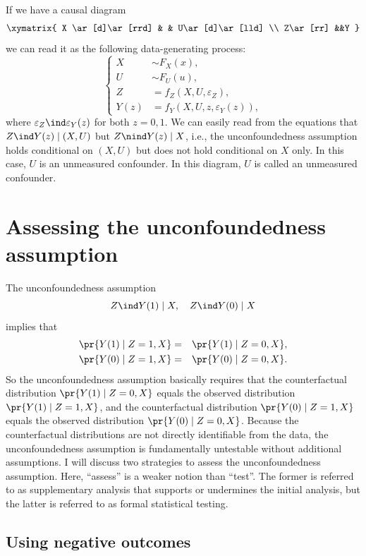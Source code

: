 If we have a causal diagram 
$$
\xymatrix{
 X \ar[d]\ar[rrd] & & U\ar[d]\ar[lld] \\
Z\ar[rr] &&Y 
}
$$
we can read it as  the following data-generating process: 
$$
\left\{ 
\begin{aligned}
       X & \sim F_X(x), \\
       U& \sim F_U(u), \\ 
      Z  &=   f_Z(X, U,  \varepsilon_Z) , \\
      Y(z) &=  f_Y(X, U, z, \varepsilon_Y(z)) ,
\end{aligned}
\right. 
$$
where $\varepsilon_Z \ind \varepsilon_Y(z)$ for both $z=0,1$. We can easily read from the equations that $Z\ind Y(z) \mid (X,U)$ but $Z\nind Y(z) \mid X$, i.e., the unconfoundedness assumption holds conditional on $(X,U)$ but does not hold conditional on $X$ only. In this case, $U$ is an unmeasured confounder. In this diagram, $U$ is called an unmeasured confounder. 






\section{Assessing the unconfoundedness assumption}


The unconfoundedness assumption 
$$
Z\ind Y(1) \mid X, \quad 
Z\ind Y(0) \mid X
$$
implies that 
\begin{eqnarray*}
\pr\{ Y(1)\mid  Z=1, X \}  &=& \pr\{ Y(1)\mid  Z=0, X \} , \\
\pr\{ Y(0)\mid  Z=1, X \} &=& \pr\{ Y(0)\mid  Z=0, X \} . 
\end{eqnarray*}
So the unconfoundedness assumption basically requires that the counterfactual distribution $\pr\{ Y(1)\mid  Z=0, X \}$ equals the observed distribution 
$\pr\{ Y(1)\mid  Z=1, X \}$, and the counterfactual distribution $\pr\{ Y(0)\mid  Z=1, X \} $ equals the observed distribution $\pr\{ Y(0)\mid  Z=0, X \}$. Because the counterfactual distributions are not directly identifiable from the data, the unconfoundedness assumption is fundamentally untestable without additional assumptions. I will discuss two strategies to assess the unconfoundedness assumption. Here, ``assess'' is a weaker notion than ``test''. The former is referred to as supplementary analysis that supports or undermines the initial analysis, but the latter is referred to as formal statistical testing. 



\subsection{Using negative outcomes}


